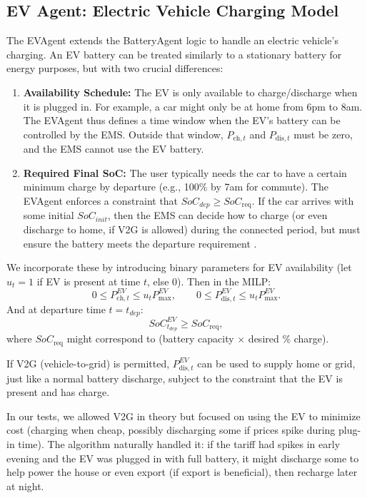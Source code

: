 \documentclass[12pt,a4paper]{article}
\begin{document}
\subsection{EV Agent: Electric Vehicle Charging Model}
The EVAgent extends the BatteryAgent logic to handle an electric vehicle’s charging. An EV battery can be treated similarly to a stationary battery for energy purposes, but with two crucial differences:
\begin{enumerate}
    \item \textbf{Availability Schedule:} The EV is only available to charge/discharge when it is plugged in. For example, a car might only be at home from 6pm to 8am. The EVAgent thus defines a time window when the EV’s battery can be controlled by the EMS. Outside that window, $P_{\text{ch},t}$ and $P_{\text{dis},t}$ must be zero, and the EMS cannot use the EV battery.
    \item \textbf{Required Final SoC:} The user typically needs the car to have a certain minimum charge by departure (e.g., 100\% by 7am for commute). The EVAgent enforces a constraint that $SoC_{dep} \ge SoC_{\text{req}}$. If the car arrives with some initial $SoC_{init}$, then the EMS can decide how to charge (or even discharge to home, if V2G is allowed) during the connected period, but must ensure the battery meets the departure requirement \cite{Rehman2025}.
\end{enumerate}

We incorporate these by introducing binary parameters for EV availability (let $u_t = 1$ if EV is present at time $t$, else $0$). Then in the MILP:
\[
0 \le P_{\text{ch},t}^{EV} \le u_t P_{\max}^{EV}, \qquad
0 \le P_{\text{dis},t}^{EV} \le u_t P_{\max}^{EV}.
\]
And at departure time $t = t_{dep}$:
\[
SoC_{t_{dep}}^{EV} \ge SoC_{\text{req}},
\] 
where $SoC_{\text{req}}$ might correspond to (battery capacity $\times$ desired \% charge).

If V2G (vehicle-to-grid) is permitted, $P_{\text{dis},t}^{EV}$ can be used to supply home or grid, just like a normal battery discharge, subject to the constraint that the EV is present and has charge.

In our tests, we allowed V2G in theory but focused on using the EV to minimize cost (charging when cheap, possibly discharging some if prices spike during plug-in time). The algorithm naturally handled it: if the tariff had spikes in early evening and the EV was plugged in with full battery, it might discharge some to help power the house or even export (if export is beneficial), then recharge later at night.
\end{document}
